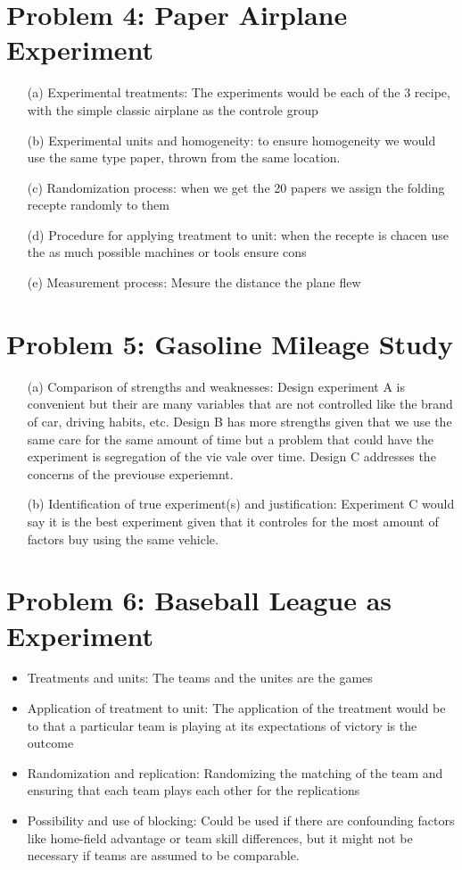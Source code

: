 \documentclass[10pt, oneside]{article}
\begin{document}
\section*{Problem 4: Paper Airplane Experiment}
\begin{itemize}
	\item[(a)] Experimental treatments: The experiments would be each of the 3 recipe, with the simple classic airplane as the controle group
	\item[(b)] Experimental units and homogeneity: to ensure homogeneity we would use the same type paper, thrown from the same location.
	\item[(c)] Randomization process: when we get the 20 papers we assign the folding recepte randomly to them
	\item[(d)] Procedure for applying treatment to unit: when the recepte is chacen use the as much possible machines or tools ensure cons
	\item[(e)] Measurement process: Mesure the distance the plane flew 
\end{itemize}

\section*{Problem 5: Gasoline Mileage Study}
\begin{itemize}
	\item[(a)] Comparison of strengths and weaknesses:
    Design experiment A is convenient but their are many variables that are not controlled like the 
    brand of car, driving habits, etc. Design B has more strengths given that we use the same care for the same amount of time but a problem that could 
    have the experiment is segregation of the vie vale over time. Design C addresses the concerns of the previouse experiemnt.
	\item[(b)] Identification of true experiment(s) and justification:
    Experiment C would say it is the best experiment given that it controles for the most amount of factors buy using the same vehicle.
\end{itemize}

\section*{Problem 6: Baseball League as Experiment}
\begin{itemize}
	\item Treatments and units: The teams and the unites are the games
	\item Application of treatment to unit: The application of the treatment would be to 
    that a particular team is playing at its expectations of victory is the outcome
	\item Randomization and replication: Randomizing the matching of the team and ensuring that each team plays each other for the replications
	\item Possibility and use of blocking: Could be used if there are confounding factors like home-field advantage or team skill differences, but it might not be necessary if teams are assumed to be comparable.
\end{itemize}
\end{document}
